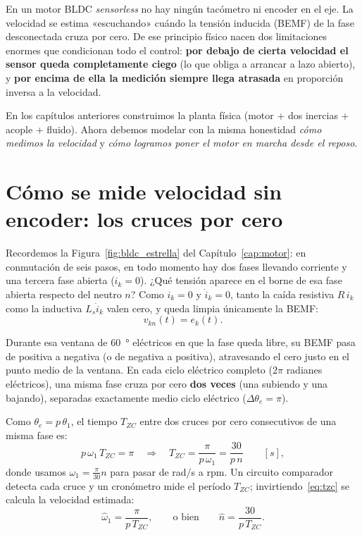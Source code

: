 \documentclass[11pt,a4paper,oneside]{book}
\begin{document}
\begin{ideafisica}
En un motor BLDC \emph{sensorless} no hay ningún tacómetro ni encoder en el eje.
La velocidad se estima «escuchando» cuándo la tensión inducida (BEMF) de la fase
desconectada cruza por cero. De ese principio físico nacen dos limitaciones
enormes que condicionan todo el control: \textbf{por debajo de cierta velocidad
el sensor queda completamente ciego} (lo que obliga a arrancar a lazo abierto),
y \textbf{por encima de ella la medición siempre llega atrasada} en proporción
inversa a la velocidad.
\end{ideafisica}

En los capítulos anteriores construimos la planta física (motor + dos inercias +
acople + fluido). Ahora debemos modelar con la misma honestidad \emph{cómo
medimos la velocidad} y \emph{cómo logramos poner el motor en marcha desde el
reposo}.

\section{Cómo se mide velocidad sin encoder: los cruces por cero}

Recordemos la Figura~\ref{fig:bldc_estrella} del Capítulo~\ref{cap:motor}: en
conmutación de seis pasos, en todo momento hay dos fases llevando corriente y
una tercera fase abierta ($i_k = 0$). ¿Qué tensión aparece en el borne de esa
fase abierta respecto del neutro $n$? Como $i_k = 0$ y $\dot i_k = 0$, tanto la
caída resistiva $R\,i_k$ como la inductiva $L_s\dot i_k$ valen cero, y queda
limpia únicamente la BEMF:
\[
  v_{kn}(t) = e_k(t).
\]

Durante esa ventana de \SI{60}{\degree} eléctricos en que la fase queda libre,
su BEMF pasa de positiva a negativa (o de negativa a positiva), atravesando el
cero justo en el punto medio de la ventana. En cada ciclo eléctrico completo
($2\pi$ radianes eléctricos), una misma fase cruza por cero \textbf{dos veces}
(una subiendo y una bajando), separadas exactamente medio ciclo eléctrico
($\Delta\theta_e = \pi$).

Como $\theta_e = p\,\theta_1$, el tiempo $T_{ZC}$ entre dos cruces por cero
consecutivos de una misma fase es:
\begin{equation}
  p\,\omega_1\,T_{ZC} = \pi
  \quad\Longrightarrow\quad
  T_{ZC} = \frac{\pi}{p\,\omega_1} = \frac{30}{p\,n}\qquad [\si{s}],
  \label{eq:tzc}
\end{equation}
donde usamos $\omega_1 = \frac{\pi}{30}n$ para pasar de \si{rad/s} a \si{rpm}.
Un circuito comparador detecta cada cruce y un cronómetro mide el período
$T_{ZC}$; invirtiendo~\eqref{eq:tzc} se calcula la velocidad estimada:
\begin{equation}
  \hat\omega_1 = \frac{\pi}{p\,T_{ZC}},
  \qquad\text{o bien}\qquad
  \hat n = \frac{30}{p\,T_{ZC}}.
  \label{eq:omega_de_tzc}
\end{equation}
\end{document}
